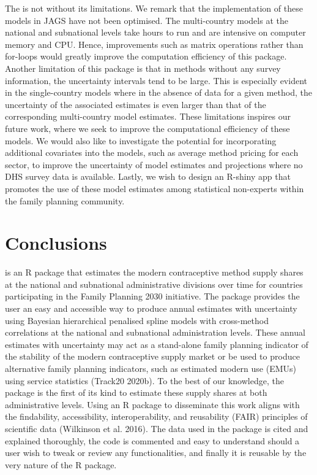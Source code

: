 The  is not without its limitations. We remark that the implementation of these models in JAGS have not been optimised. The multi-country models at the national and subnational levels take hours to run and are intensive on computer memory and CPU. Hence, improvements such as matrix operations rather than for-loops would greatly improve the computation efficiency of this package. Another limitation of this package is that in methods without any survey information, the uncertainty intervals tend to be large. This is especially evident in the single-country models where in the absence of data for a given method, the uncertainty of the associated estimates is even larger than that of the corresponding multi-country model estimates. These limitations inspires our future work, where we seek to improve the computational efficiency of these models. We would also like to investigate the potential for incorporating additional covariates into the models, such as average method pricing for each sector, to improve the uncertainty of model estimates and projections where no DHS survey data is available. Lastly, we wish to design an R-shiny app that promotes the use of these model estimates among statistical non-experts within the family planning community.

\hypertarget{conclusions}{%
\section{Conclusions}\label{conclusions}}

 is an R package that estimates the modern contraceptive method supply shares at the national and subnational administrative divisions over time for countries participating in the Family Planning 2030 initiative. The package provides the user an easy and accessible way to produce annual estimates with uncertainty using Bayesian hierarchical penalised spline models with cross-method correlations at the national and subnational administration levels. These annual estimates with uncertainty may act as a stand-alone family planning indicator of the stability of the modern contraceptive supply market or be used to produce alternative family planning indicators, such as estimated modern use (EMUs) using service statistics (Track20 2020b). To the best of our knowledge, the package is the first of its kind to estimate these supply shares at both administrative levels. Using an R package to disseminate this work aligns with the findability, accessibility, interoperability, and reusability (FAIR) principles of scientific data (Wilkinson et al. 2016). The data used in the package is cited and explained thoroughly, the code is commented and easy to understand should a user wish to tweak or review any functionalities, and finally it is reusable by the very nature of the R package.

